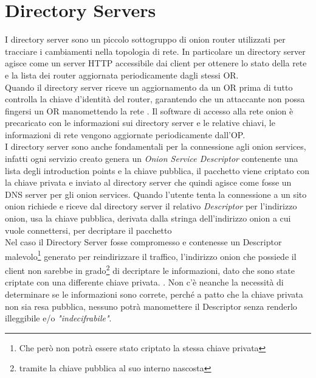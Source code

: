 \newpage
\section{Directory Servers} \label{sec:DirectoryServers}
I directory server sono un piccolo sottogruppo di onion router utilizzati per tracciare i cambiamenti nella topologia di rete. 
In particolare un directory server agisce come un server HTTP accessibile dai client per ottenere lo stato della rete e la lista dei router aggiornata periodicamente dagli stessi OR. \\
Quando il directory server riceve un aggiornamento da un OR prima di tutto controlla la chiave d'identità del router, garantendo che un attaccante non possa fingersi un OR manomettendo la rete \cite{ChaumMixes}. 
Il software di accesso alla rete onion è precaricato con le informazioni sui directory server e le relative chiavi, le informazioni di rete vengono aggiornate periodicamente dall'OP. \\

I directory server sono anche fondamentali per la connessione agli onion services, infatti ogni servizio creato genera un \emph{Onion Service Descriptor} contenente una lista degli introduction points e la chiave pubblica, il pacchetto viene criptato con la chiave privata e inviato al directory server che quindi agisce come fosse un DNS server per gli onion services. 
Quando l'utente tenta la connessione a un sito onion richiede e riceve dal directory server il relativo \emph{Descriptor} per l'indirizzo onion, usa la chiave pubblica, derivata dalla stringa dell'indirizzo onion a cui vuole connettersi, per decriptare il pacchetto \\
Nel caso il Directory Server fosse compromesso e contenesse un Descriptor malevolo\footnote{Che però non potrà essere stato criptato la stessa chiave privata} generato per reindirizzare il traffico, l'indirizzo onion che possiede il client non sarebbe in grado\footnote{tramite la chiave pubblica al suo interno nascosta} di decriptare le informazioni, dato che sono state criptate con una differente chiave privata.
\cite{OnionServicesOverview}.
Non c'è neanche la necessità di determinare se le informazioni sono correte, perché a patto che la chiave privata non sia resa pubblica, nessuno potrà manomettere il Descriptor senza renderlo illeggibile e/o \emph{"indecifrabile"}.
